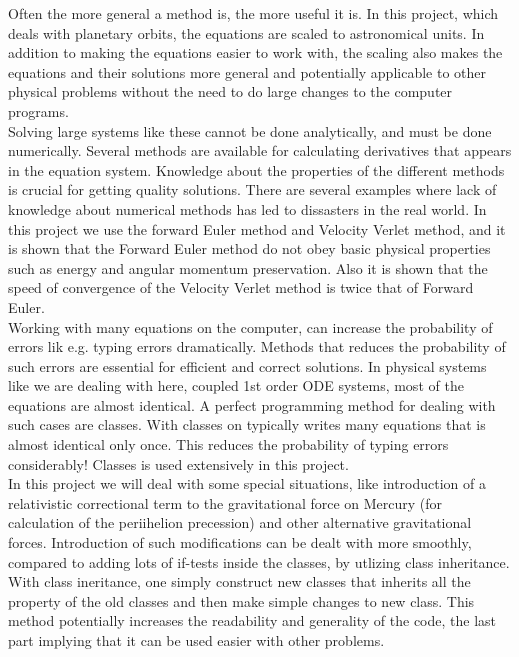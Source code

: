 \documentclass{article}
\begin{document}
Often the more general a method is, the more useful it is. In this project, which deals with planetary orbits, the equations are scaled to astronomical units. In addition to making the equations easier to work with, the scaling also makes the equations and their solutions more general and potentially applicable to other physical problems without the need to do large changes to the computer programs.\\

Solving large systems like these cannot be done analytically, and must be done numerically. Several methods are available for calculating derivatives that appears in the equation system. Knowledge about the properties of the different methods is crucial for getting quality solutions. There are several examples where lack of knowledge about numerical methods has led to dissasters in the real world. In this project we use the forward Euler method and Velocity Verlet method, and it is shown that the Forward Euler method do not obey basic physical properties such as energy and angular momentum preservation. Also it is shown that the speed of convergence of the Velocity Verlet method is twice that of Forward Euler.\\

Working with many equations on the computer, can increase the probability of errors lik e.g. typing errors dramatically. Methods that reduces the probability of such errors are essential for efficient and correct solutions. In physical systems like we are dealing with here, coupled 1st order ODE systems, most of the equations are almost identical. A perfect programming method for dealing with such cases are classes. With classes on typically writes many equations that is almost identical only once. This reduces the probability of typing errors considerably! Classes is used extensively in this project.\\

In this project we will deal with some special situations, like introduction of a relativistic correctional term to the gravitational force on Mercury (for calculation of the periihelion precession) and other alternative gravitational forces. Introduction of such modifications can be dealt with more smoothly, compared to adding lots of if-tests inside the classes, by utlizing class inheritance. With class ineritance, one simply construct new classes that inherits all the property of the old classes and then make simple changes to new class. This method potentially increases the readability and generality of the code, the last part implying that it can be used easier with other problems.\\
\end{document}
